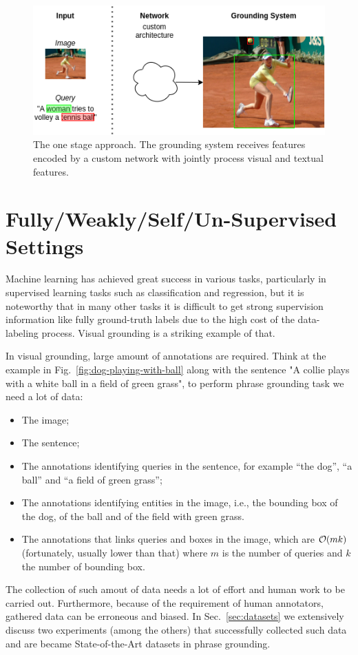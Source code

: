 \begin{figure}
  \centering
  \includegraphics[width=.8\textwidth]{figures/one-stage-approach.png}
  \caption[One stage approach]{
    The one stage approach. The grounding system receives features
    encoded by a custom network with jointly process visual and
    textual features.
  }
  \label{fig:one-stage-approach}
\end{figure}

\section{Fully/Weakly/Self/Un-Supervised Settings}

Machine learning has achieved great success in various tasks,
particularly in supervised learning tasks such as classification and
regression, but it is noteworthy that in many other tasks it is
difficult to get strong supervision information like fully
ground-truth labels due to the high cost of the data-labeling process.
Visual grounding is a striking example of that. 

In visual grounding, large amount of annotations are required. Think
at the example in Fig.~\ref{fig:dog-playing-with-ball} along with the
sentence "A collie plays with a white ball in a field of green grass",
to perform phrase grounding task we need a lot of data: 
\begin{itemize}
  \item The image;
  \item The sentence;
  \item The annotations identifying queries in the sentence, for
  example ``the dog'', ``a ball'' and ``a field of green grass'';
  \item The annotations identifying entities in the image, i.e., the
  bounding box of the dog, of the ball and of the field with green
  grass.
  \item The annotations that links queries and boxes in the image,
  which are $\mathcal{O}(mk)$ (fortunately, usually lower than that) where
  $m$ is the number of queries and $k$ the number of bounding box.
\end{itemize}
The collection of such amout of data needs a lot of effort and human
work to be carried out. Furthermore, because of the requirement of
human annotators, gathered data can be erroneous and biased. In
Sec.~\ref{sec:datasets} we extensively discuss two experiments (among
the others) that successfully collected such data and are became
State-of-the-Art datasets in phrase grounding.


